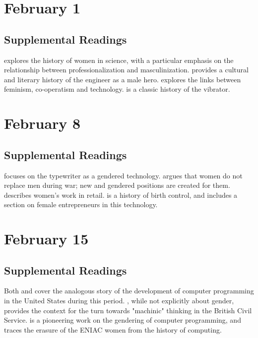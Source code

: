 \documentclass[11pt]{article}
\begin{document}
\section{February 1}
\label{sec:orgb811680}


\subsection{Supplemental Readings}
\label{sec:org7002c00}

\cite{Rossiter:1982vn} explores the history of women in science, with a particular emphasis on the relationship between professionalization and masculinization.   \cite{Tichi:1987wb} provides a cultural and literary history of the engineer as a male hero. \cite{Hacker:1989tm} explores the links between feminism, co-operatism and technology.  \cite{Maines:1999uw} is a classic history of the vibrator.

\section{February 8}
\label{sec:org0a39bfb}


\subsection{Supplemental Readings}
\label{sec:org0efad31}

\cite{Davies:1982vb} focuses on the typewriter as a gendered technology.
\cite{Milkman:1987tl} argues that women do not replace men during war;
new and gendered positions are created for them. \cite{Benson:1987wl}
describes women's work in retail. \cite{Tone:2001to} is a history of
birth control, and includes a section on female entrepreneurs in this
technology.

\section{February 15}
\label{sec:orgea8f63f}


\subsection{Supplemental Readings}
\label{sec:orgd85fb26}

Both \cite{Ensmenger:2010te} and \cite{Abbate:2012wq} cover the
analogous story of the development of computer programming in the United
States during this period. \cite{Agar:2003wf}, while not explicitly
about gender, provides the context for the turn towards "machinic"
thinking in the British Civil Service. \cite{Edwards:1990ua} is a pioneering work on the gendering of computer programming, and \cite{Light:1999wg} traces the erasure of the ENIAC women from the history of computing.
\end{document}
